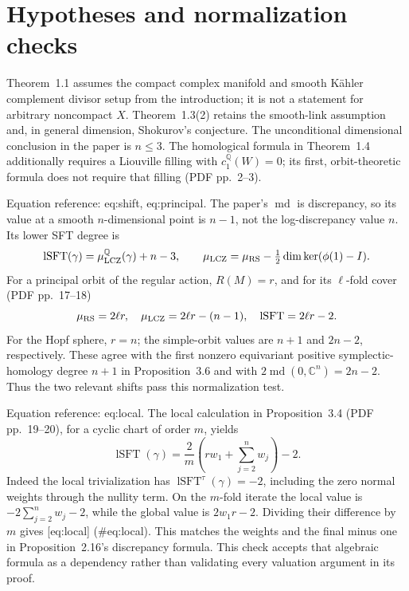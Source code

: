 \documentclass[10pt]{article}
\begin{document}
\section*{Hypotheses and normalization checks}
Theorem 1.1 assumes the compact complex manifold and smooth Kähler complement divisor setup from the introduction; it is not a statement for arbitrary noncompact \(X\). Theorem 1.3(2) retains the smooth-link assumption and, in general dimension, Shokurov’s conjecture. The unconditional dimensional conclusion in the paper is \(n\leq3\). The homological formula in Theorem 1.4 additionally requires a Liouville filling with \(c_1^\mathbb Q(W)=0\); its first, orbit-theoretic formula does not require that filling (PDF pp. 2–3).\par
Equation reference: eq:shift, eq:principal. The paper’s \(\operatorname{md}\) is discrepancy, so its value at a smooth \(n\)-dimensional point is \(n-1\), not the log-discrepancy value \(n\). Its lower SFT degree is \[
 \operatorname{lSFT}(\gamma)=\mu^\mathbb Q_{\rm LCZ}(\gamma)+n-3,\qquad
 \mu_{\rm LCZ}=\mu_{\rm RS}-\tfrac12\dim\ker(\phi(1)-I).\] For a principal orbit of the regular action, \(R(M)=r\), and for its \(\ell\)-fold cover (PDF pp. 17–18) \[
 \mu_{\rm RS}=2\ell r,\quad
 \mu_{\rm LCZ}=2\ell r-(n-1),\quad
 \operatorname{lSFT}=2\ell r-2.\] For the Hopf sphere, \(r=n\); the simple-orbit values are \(n+1\) and \(2n-2\), respectively. These agree with the first nonzero equivariant positive symplectic-homology degree \(n+1\) in Proposition 3.6 and with \(2\operatorname{md}(0,\mathbb C^n)=2n-2\). Thus the two relevant shifts pass this normalization test.\par
Equation reference: eq:local. The local calculation in Proposition 3.4 (PDF pp. 19–20), for a cyclic chart of order \(m\), yields \[
 \operatorname{lSFT}(\gamma)
 =\frac2m\left(rw_1+\sum_{j=2}^{n}w_j\right)-2.\] Indeed the local trivialization has \(\operatorname{lSFT}^\tau(\gamma)=-2\), including the zero normal weights through the nullity term. On the \(m\)-fold iterate the local value is \(-2\sum_{j=2}^nw_j-2\), while the global value is \(2w_1r-2\). Dividing their difference by \(m\) gives [eq:local] (\#eq:local). This matches the weights and the final minus one in Proposition 2.16’s discrepancy formula. This check accepts that algebraic formula as a dependency rather than validating every valuation argument in its proof.\par
\end{document}
